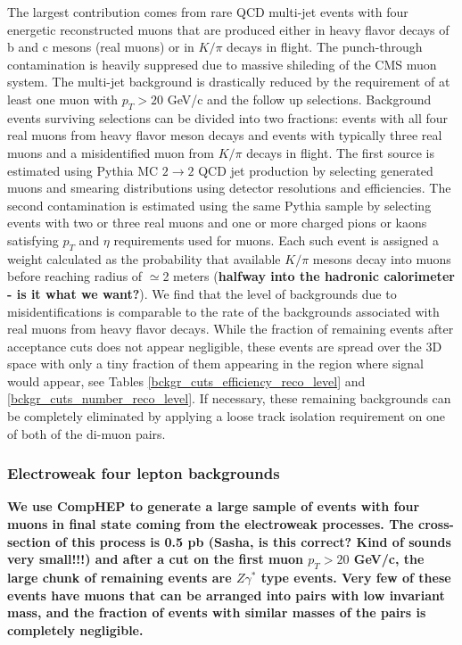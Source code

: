 \documentclass[aps,12pt,superscriptaddress,nofootinbib,floatfix,showpacs]{revtex4}
\begin{document}
The largest contribution comes from rare QCD multi-jet events with four energetic
reconstructed  muons that are produced either in heavy flavor decays of b and c mesons
(real muons) or in $K/\pi$  decays in flight. The punch-through contamination is
heavily suppresed due to massive shileding  of the CMS muon system.  The multi-jet
background is drastically reduced by the requirement of  at least one muon with
$p_T>20$ GeV/c and the follow up selections. Background events surviving  selections
can be divided into two fractions: events with all four real muons from heavy flavor 
meson decays and events with typically three real muons and a misidentified muon from
$K/\pi$  decays in flight. The first source is estimated using Pythia MC $2 \to 2$ QCD
jet production  by selecting generated muons and smearing distributions using detector
resolutions and efficiencies.  The second contamination is estimated using the same
Pythia sample by selecting events with two  or three real muons and one or more
charged pions or kaons satisfying $p_T$ and $\eta$ requirements  used for muons. Each
such event is assigned a weight calculated as the probability that available $K/\pi$
mesons decay into muons before reaching radius of $\simeq$2 meters ({\bf halfway into
the hadronic  calorimeter - is it what we want?}). We find that the level of
backgrounds due to misidentifications is  comparable to the rate of the backgrounds
associated with real muons from heavy flavor decays.  While the fraction of remaining
events after acceptance cuts does not appear negligible, these events are spread over
the 3D space with only a tiny fraction of them appearing in the region where signal
would appear, see Tables \ref{bckgr_cuts_efficiency_reco_level} and
\ref{bckgr_cuts_number_reco_level}.  If necessary, these remaining backgrounds can be
completely eliminated by applying a loose track isolation  requirement on one of both
of the di-muon pairs.

\subsubsection{Electroweak four lepton backgrounds}

{\bf We use CompHEP to generate a large sample of events with four muons in final
state coming from the electroweak processes. The cross-section of this process is 0.5
pb ({\bf Sasha, is this correct? Kind of sounds very  small!!!}) and after a cut on
the first muon $p_T>20$ GeV/c, the large chunk of remaining events are  $Z\gamma^*$
type events. Very few of these events have muons that can be arranged into pairs with
low invariant  mass, and the fraction of events with similar masses of the pairs is
completely negligible.}
\end{document}
